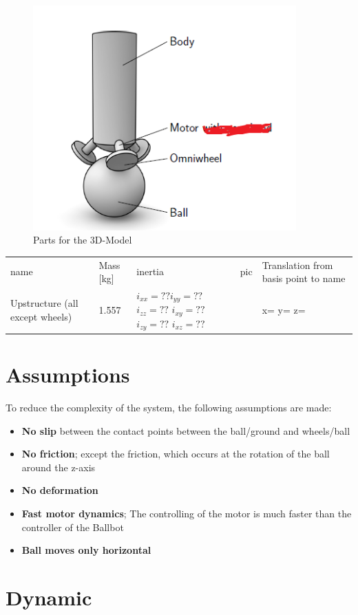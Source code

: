 \documentclass[twoside,colorback,accentcolor=tud4c,11pt]{tudreport}
\begin{document}
	
	\begin{figure}[htbp]
		\centering
		\includegraphics[width=0.9\textwidth]{img/Strucuture.PNG}
		\caption{Parts for the 3D-Model}
		\label{fig:Structure}
	\end{figure}
	
	\begin{tabular}{l l p{15mm} l p{60mm}}
		name & Mass [kg] & inertia & pic &Translation from basis point to name\\
		Upstructure (all except wheels)&1.557 &$i_{xx}=??$\newline $i_{yy}=??$
		\newline $i_{zz}=??$ \newline $i_{xy}=??$ \newline $i_{zy}=??$ \newline $i_{xz}=??$& &x= \newline y= \newline z= \\
	\end{tabular}
	
	\section{Assumptions}
	
	To reduce the complexity of the system, the following assumptions are made: 
	
	\begin{itemize}
		\item \textbf{No slip} between the contact points between the ball/ground and wheels/ball
		\item \textbf{No friction}; except the friction, which occurs at the rotation of the ball around the z-axis
		\item \textbf{No deformation}
		\item \textbf{Fast motor dynamics}; The controlling of the motor is much faster than the controller of the Ballbot
		\item \textbf{Ball moves only horizontal}
	\end{itemize}
	
	\section{Dynamic}
	
	
	
	
\end{document}
